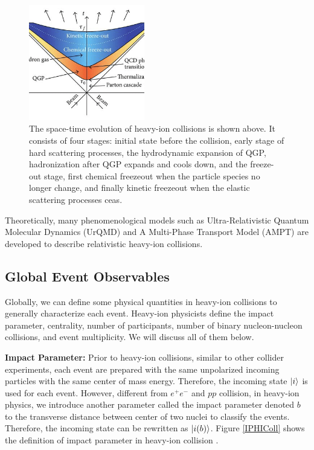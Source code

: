 \begin{figure}[hbtp]
\begin{center}
\includegraphics[width=0.45\textwidth]{Figures/Chapter1/HICSTEvolve.png}
\caption{The space-time evolution of heavy-ion collisions is shown above. It consists of four stages: initial state before the collision, early stage of hard scattering processes, the hydrodynamic expansion of QGP, hadronization after QGP expands and cools down, and the freeze-out stage, first chemical freezeout when the particle species no longer change, and finally kinetic freezeout when the elastic scattering processes ceas.}
\label{HICEvolution}
\end{center}
\end{figure} 

Theoretically, many phenomenological models such as Ultra-Relativistic Quantum Molecular Dynamics (UrQMD) and A Multi-Phase Transport Model (AMPT) are developed to describe relativistic heavy-ion collisions. 


\subsection{Global Event Observables}

Globally, we can define some physical quantities in heavy-ion collisions to generally characterize each event. Heavy-ion physicists define the impact parameter, centrality, number of participants, number of binary nucleon-nucleon collisions, and event multiplicity. We will discuss all of them below.

\textbf{Impact Parameter:} Prior to heavy-ion collisions, similar to other collider experiments, each event are prepared with the same unpolarized incoming particles with the same center of mass energy. Therefore, the incoming state $\ket{i}$ is used for each event. However, different from $e^+ e^-$ and $pp$ collision, in heavy-ion physics, we introduce another parameter called the impact parameter denoted $b$ to the transverse distance between center of two nuclei to classify the events. Therefore, the incoming state can be rewritten as  $\ket{i (b)}$. Figure \ref{IPHIColl} shows the definition of impact parameter in heavy-ion collision \cite{IPHICText}.

